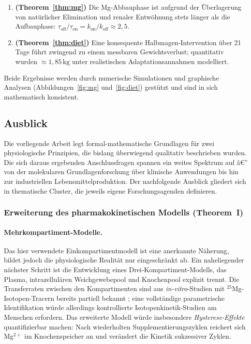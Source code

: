 ﻿\documentclass[12pt,a4paper]{article}
\theoremstyle{plain}
\theoremstyle{definition}
\theoremstyle{remark}
\begin{document}
\begin{enumerate}
  \item \textbf{(Theorem~\ref{thm:mg})} Die Mg-Abbauphase ist aufgrund der
        Überlagerung von natürlicher Elimination und renaler Entwöhnung stets
        länger als die Aufbauphase: $\tau_\text{off} / \tau_\text{on} =
        k_\text{on}/k_\text{off} \approx 2{,}5$.

  \item \textbf{(Theorem~\ref{thm:diet})} Eine konsequente Halbmagen-Intervention
        über 21 Tage führt zwingend zu einem messbaren Gewichtsverlust;
        quantitativ wurden $\approx 1{,}85\,\text{kg}$ unter realistischen
        Adaptationsannahmen modelliert.
\end{enumerate}

Beide Ergebnisse werden durch numerische Simulationen und graphische Analysen
(Abbildungen~\ref{fig:mg} und~\ref{fig:diet}) gestützt und sind in sich
mathematisch konsistent.

\subsection{Ausblick}
\label{ssec:outlook}

Die vorliegende Arbeit legt formal-mathematische Grundlagen für zwei
physiologische Prinzipien, die bislang überwiegend qualitativ beschrieben
wurden. Die sich daraus ergebenden Anschlussfragen spannen ein weites
Spektrum auf â€” von der molekularen Grundlagenforschung über klinische
Anwendungen bis hin zur industriellen Lebensmittelproduktion. Der
nachfolgende Ausblick gliedert sich in thematische Cluster, die jeweils
eigene Forschungsagenden definieren.

\subsubsection{Erweiterung des pharmakokinetischen Modells (Theorem~I)}

\paragraph{Mehrkompartiment-Modelle.}
Das hier verwendete Einkompartimentmodell ist eine anerkannte Näherung,
bildet jedoch die physiologische Realität nur eingeschränkt ab. Ein
naheliegender nächster Schritt ist die Entwicklung eines
Drei-Kompartiment-Modells, das Plasma, intrazellulären
Weichgewebepool und Knochenpool explizit trennt. Die
Transferraten zwischen den Kompartimenten sind aus
\textit{in-vitro}-Studien mit ${}^{25}$Mg-Isotopen-Tracern bereits
partiell bekannt \cite{Schuchardt2017}; eine vollständige parametrische
Identifikation würde allerdings kontrollierte Isotopenkinetik-Studien am
Menschen erfordern. Das erweiterte Modell würde insbesondere
\emph{Hysterese-Effekte} quantifizierbar machen: Nach wiederholten
Supplementierungszyklen reichert sich Mg$^{2+}$ im Knochenspeicher an und
verändert die Kinetik sukzessiver Zyklen.
\end{document}
